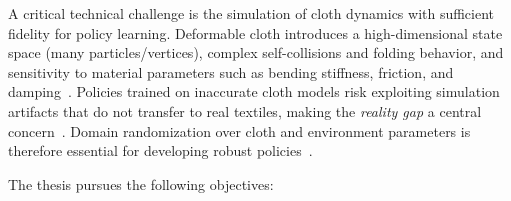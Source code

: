 A critical technical challenge is the simulation of cloth dynamics with sufficient fidelity for policy learning. Deformable cloth introduces a high-dimensional state space (many particles/vertices), complex self-collisions and folding behavior, and sensitivity to material parameters such as bending stiffness, friction, and damping~\cite{Longhini2025ReviewClothManipulation,muller2007pbd}. Policies trained on inaccurate cloth models risk exploiting simulation artifacts that do not transfer to real textiles, making the \emph{reality gap} a central concern~\cite{Salvato2021RealityGapSurvey}. Domain randomization over cloth and environment parameters is therefore essential for developing robust policies~\cite{Tobin2017DomainRand,Peng2018DynamicsRandomization}.

The thesis pursues the following objectives:

